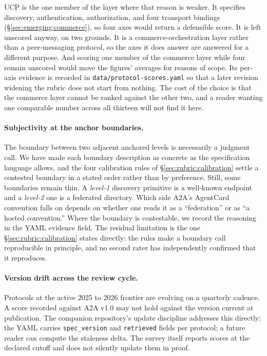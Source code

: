 UCP is the one member of the layer where that reason is
weaker. It specifies discovery, authentication,
authorization, and four transport bindings
(\S\ref{sec:emerging:commerce}), so four axes would return a
defensible score. It is left unscored anyway, on two
grounds. It is a commerce-orchestration layer rather than a
peer-messaging protocol, so the axes it does answer are
answered for a different purpose. And scoring one member of
the commerce layer while four remain unscored would move the
figures' averages for reasons of scope. Its per-axis
evidence is recorded in
\texttt{data/protocol-scores.yaml} so that a later revision
widening the rubric does not start from nothing. The cost of
the choice is that the commerce layer cannot be ranked
against the other two, and a reader wanting one comparable
number across all thirteen will not find it here.

\paragraph{Subjectivity at the anchor boundaries.} The
boundary between two adjacent anchored levels is
necessarily a judgment call. We have made each boundary
description as concrete as the specification language
allows, and the four calibration rules of
\S\ref{sec:rubric:calibration} settle a contested boundary
in a stated order rather than by preference. Still, some
boundaries remain thin. A \emph{level-1} discovery primitive
is a well-known endpoint and a \emph{level-2} one is a
federated directory. Which side A2A's AgentCard convention
falls on depends on whether one reads it as a
``federation'' or as ``a
hosted convention.'' Where the boundary is contestable, we
record the reasoning in the YAML evidence field. The
residual limitation is the one
\S\ref{sec:rubric:calibration} states directly: the rules
make a boundary call reproducible in principle, and no
second rater has independently confirmed that it
reproduces.

\paragraph{Version drift across the review cycle.}
Protocols at the active 2025 to 2026 frontier are evolving
on a quarterly cadence. A score recorded against
A2A v1.0 may not hold against the version current at
publication. The companion repository's update discipline
addresses this directly: the YAML carries
\texttt{spec\_version} and \texttt{retrieved} fields per
protocol; a future reader can compute the staleness
delta. The survey itself reports scores at the declared
cutoff and does not silently update them in proof.

